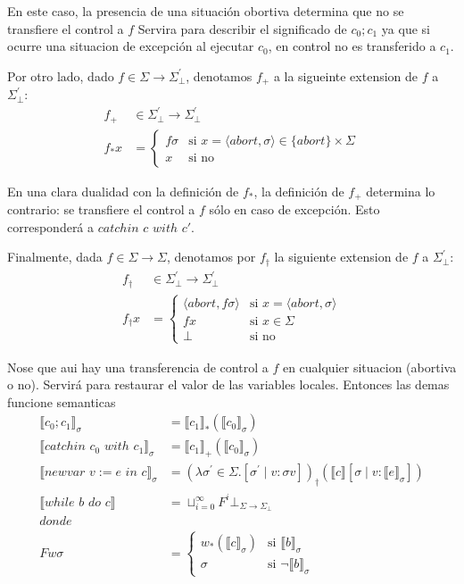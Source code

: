\documentclass[12pt,a4paper]{article}
\begin{document}
En este caso, la presencia de una situación obortiva determina que no se 
transfiere el control a $f$ Servira para describir el significado de $c_{0};c_{1}$
ya que si ocurre una situacion de excepción al ejecutar $c_{0}$, en control no es 
transferido a $c_{1}$.

Por otro lado, dado $f\in \Sigma \to \Sigma^{'}_{\bot}$, denotamos $f_{+}$ a la sigueinte extension de $f$ a $\Sigma^{'}_{\bot}$:
\begin{align*}
f_{+} & \in \Sigma^{'}_{\bot} \to \Sigma^{'}_{\bot}\\
f_{*}x &= \begin{cases}
  f \sigma & \text{si}\,\, x = \langle abort, \sigma \rangle \in \{ abort\}\times \Sigma\\
  x & \text{si no}
\end{cases}
\end{align*}

En una clara dualidad con la definición de $f_{*}$, la definición de $f_{+}$ 
determina lo contrario: se transfiere el control a $f$ sólo en caso de excepción. 
Esto corresponderá a $catchin\,\, c\,\, with\,\, c'$.

Finalmente, dada $f\in \Sigma \to \Sigma$, denotamos por $f_{\dagger}$ la siguiente
extension de $f$ a $\Sigma^{'}_{\bot}$:
\begin{align*}
f_{\dagger} & \in \Sigma^{'}_{\bot} \to \Sigma^{'}_{\bot}\\
f_{\dagger}x &= \begin{cases}
  \langle abort, f\sigma \rangle & \text{si}\,\, x = \langle abort, \sigma \rangle \\
  f x & \text{si}\,\, x \in \Sigma\\
  \bot & \text{si no}
\end{cases}
\end{align*}


Nose que aui hay una transferencia de control a $f$ en cualquier situacion (abortiva o no). Servirá para restaurar el valor de las variables locales. Entonces las 
demas funcione semanticas
\begin{align*}
\llbracket c_{0};c_{1} \rrbracket_{\sigma} &= \llbracket c_{1}\rrbracket_{*}(\llbracket c_{0}\rrbracket_{\sigma})\\
\llbracket catchin \,\,c_{0}\,\, with \,\,c_{1} \rrbracket_{\sigma} &= \llbracket c_{1}\rrbracket_{+}(\llbracket c_{0}\rrbracket_{\sigma})\\
\llbracket newvar\,\, v := e\,\, in\,\, c \rrbracket_{\sigma} &= (\lambda\sigma^{'} \in \Sigma. 
[\sigma^{'} \mid v : \sigma v])_{\dagger} (\llbracket c\rrbracket[\sigma \mid v : \llbracket e\rrbracket_{\sigma} ])\\
\llbracket while\,\,b\,\,do\,\,c\rrbracket &= \sqcup_{i=0}^{\infty} F^{i} \bot_{\Sigma \to \Sigma_{\bot}} \\
donde \\
F w \sigma &= \begin{cases}
  w_{*}(\llbracket c\rrbracket_{\sigma}) & \text{si}\,\, \llbracket b\rrbracket_{\sigma}\\
  \sigma & \text{si}\,\, \neg \llbracket b\rrbracket_{\sigma}
  \end{cases}
\end{align*}
\end{document}
